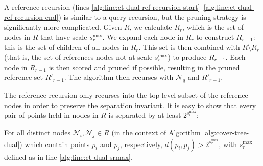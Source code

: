 A reference recursion (lines
\ref{alg:line:ct-dual-ref-recursion-start}--\ref{alg:line:ct-dual-ref-recursion-end})
is similar to a query recursion, but the pruning strategy is significantly more
complicated.  Given $R$, we calculate $R_r$, which is the set of nodes in $R$
that have scale $s_r^{\max}$.  We expand each node in $R_r$ to construct $R_{r -
1}$: this is the set of children of all nodes in $R_r$.  This set is then
combined with $R \setminus R_r$ (that is, the set of references nodes not at
scale $s_r^{\max}$) to produce $R_{r - 1}$.  Each node in $R_{r - 1}$ is then
scored and pruned if possible, resulting in the pruned reference set $R'_{r -
1}$.  The algorithm then recurses with $\mathscr{N}_q$ and $R'_{r - 1}$.

The reference recursion only recurses into the top-level subset of the reference
nodes in order to preserve the separation invariant.  It is easy to show that
every pair of points held in nodes in $R$ is separated by at least
$2^{s_r^{\max}}$:

\begin{lemma}
For all distinct nodes $\mathscr{N}_i, \mathscr{N}_j \in R$ (in the context of
Algorithm \ref{alg:cover-tree-dual}) which contain points $p_i$ and $p_j$,
respectively, $d(p_i, p_j) > 2^{s_r^{\max}}$, with $s_r^{\max}$ defined as in
line \ref{alg:line:ct-dual-srmax}.
\end{lemma}


